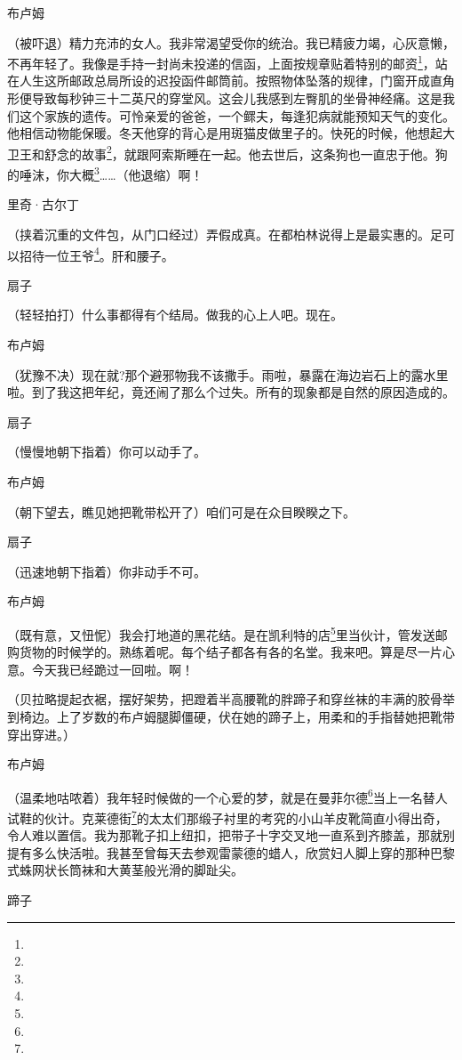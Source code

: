 \par 布卢姆
\par （被吓退）精力充沛的女人。我非常渴望受你的统治。我已精疲力竭，心灰意懒，不再年轻了。我像是手持一封尚未投递的信函，上面按规章贴着特别的邮资\footnote{}，站在人生这所邮政总局所设的迟投函件邮筒前。按照物体坠落的规律，门窗开成直角形便导致每秒钟三十二英尺的穿堂风。这会儿我感到左臀肌的坐骨神经痛。这是我们这个家族的遗传。可怜亲爱的爸爸，一个鳏夫，每逢犯病就能预知天气的变化。他相信动物能保暖。冬天他穿的背心是用斑猫皮做里子的。快死的时候，他想起大卫王和舒念的故事\footnote{}，就跟阿索斯睡在一起。他去世后，这条狗也一直忠于他。狗的唾沫，你大概\footnote{}……（他退缩）啊！
\par 里奇·古尔丁
\par （挟着沉重的文件包，从门口经过）弄假成真。在都柏林说得上是最实惠的。足可以招待一位王爷\footnote{}。肝和腰子。
\par 扇子
\par （轻轻拍打）什么事都得有个结局。做我的心上人吧。现在。
\par 布卢姆
\par （犹豫不决）现在就?那个避邪物我不该撒手。雨啦，暴露在海边岩石上的露水里啦。到了我这把年纪，竟还闹了那么个过失。所有的现象都是自然的原因造成的。
\par 扇子
\par （慢慢地朝下指着）你可以动手了。
\par 布卢姆
\par （朝下望去，瞧见她把靴带松开了）咱们可是在众目睽睽之下。
\par 扇子
\par （迅速地朝下指着）你非动手不可。
\par 布卢姆
\par （既有意，又忸怩）我会打地道的黑花结。是在凯利特的店\footnote{}里当伙计，管发送邮购货物的时候学的。熟练着呢。每个结子都各有各的名堂。我来吧。算是尽一片心意。今天我已经跪过一回啦。啊！
\par （贝拉略提起衣裾，摆好架势，把蹬着半高腰靴的胖蹄子和穿丝袜的丰满的胶骨举到椅边。上了岁数的布卢姆腿脚僵硬，伏在她的蹄子上，用柔和的手指替她把靴带穿出穿进。）
\par 布卢姆
\par （温柔地咕哝着）我年轻时候做的一个心爱的梦，就是在曼菲尔德\footnote{}当上一名替人试鞋的伙计。克莱德街\footnote{}的太太们那缎子衬里的考究的小山羊皮靴简直小得出奇，令人难以置信。我为那靴子扣上纽扣，把带子十字交叉地一直系到齐膝盖，那就别提有多么快活啦。我甚至曾每天去参观雷蒙德的蜡人，欣赏妇人脚上穿的那种巴黎式蛛网状长筒袜和大黄茎般光滑的脚趾尖。
\par 蹄子
